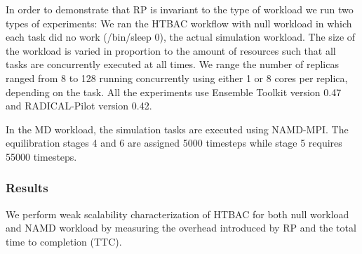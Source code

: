 In order to demonstrate that RP is invariant to the type of workload we run
two types of experiments: We ran the HTBAC workflow with null workload in
which each task did no work (/bin/sleep 0), the actual simulation workload.
The size of the workload is varied in proportion to the amount of resources
such that all tasks are concurrently executed at all times. We range the
number of replicas ranged from 8 to 128 running concurrently using either 1
or 8 cores per replica, depending on the task. All the experiments use
Ensemble Toolkit version 0.47 and RADICAL-Pilot version 0.42.

In the MD workload, the simulation tasks are executed using NAMD-MPI. The
equilibration stages 4 and 6 are assigned 5000 timesteps while stage 5
requires 55000 timesteps.

\subsubsection{Results}

We perform weak scalability characterization of HTBAC for both null workload
and NAMD workload by measuring the overhead introduced by RP and the total
time to completion (TTC).



